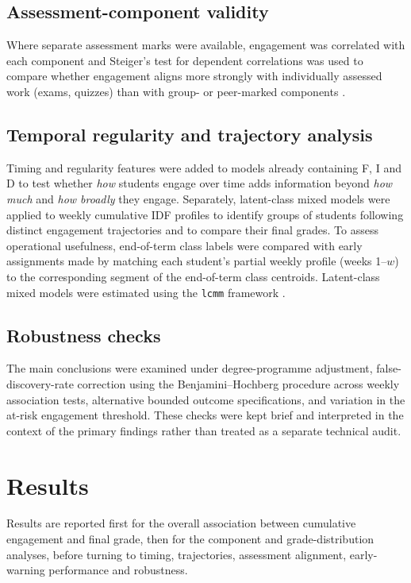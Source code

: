 \documentclass[11pt,a4paper]{article}
\begin{document}
\subsection{Assessment-component validity}
Where separate assessment marks were available, engagement was correlated with
each component and Steiger's test for dependent correlations was used to compare
whether engagement aligns more strongly with individually assessed work (exams,
quizzes) than with group- or peer-marked components \citep{steiger1980,almond2009}.

\subsection{Temporal regularity and trajectory analysis}
Timing and regularity features were added to models already containing F, I and
D to test whether \emph{how} students engage over time adds information beyond
\emph{how much} and \emph{how broadly} they engage. Separately, latent-class mixed
models were applied to weekly cumulative IDF profiles to identify groups of
students following distinct engagement trajectories and to compare their final
grades. To assess operational usefulness, end-of-term class labels were compared
with early assignments made by matching each student's partial weekly profile
(weeks 1--$w$) to the corresponding segment of the end-of-term class centroids.
Latent-class mixed models were estimated using the \texttt{lcmm} framework
\citep{proustlima2017}.

\subsection{Robustness checks}
The main conclusions were examined under degree-programme adjustment,
false-discovery-rate correction using the Benjamini--Hochberg procedure across
weekly association tests, alternative bounded outcome specifications, and
variation in the at-risk engagement threshold. These
checks were kept brief and interpreted in the context of the primary findings
rather than treated as a separate technical audit.

\section{Results}
Results are reported first for the overall association between cumulative
engagement and final grade, then for the component and grade-distribution
analyses, before turning to timing, trajectories, assessment alignment,
early-warning performance and robustness.
\end{document}
